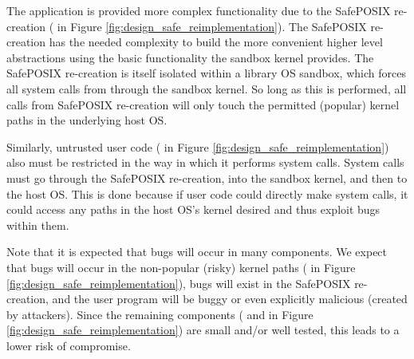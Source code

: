 The application is provided more complex functionality due to the SafePOSIX re-creation
( in Figure \ref{fig:design_safe_reimplementation}).
The SafePOSIX re-creation has the needed complexity to build the more convenient higher level
abstractions using the basic functionality the sandbox kernel provides.
The SafePOSIX re-creation is itself isolated within a library OS sandbox, which
forces all system calls from through the sandbox kernel.
So long as this is performed, all calls from SafePOSIX re-creation will only touch the permitted (popular) kernel paths in the underlying host OS.

Similarly, untrusted user code ( in Figure \ref{fig:design_safe_reimplementation}) also must be restricted in the way
in which it performs system calls.
System calls must go through the SafePOSIX re-creation, into the sandbox kernel, and then to the host OS.
This is done because if user code could directly make system calls, it could access any paths in the host OS's kernel desired
and thus exploit bugs within them.

Note that it is expected that bugs will occur in many components.
We expect that bugs will occur in the non-popular (risky) kernel paths ( in Figure \ref{fig:design_safe_reimplementation}),
bugs will exist in the SafePOSIX re-creation, and the user program will be buggy or even explicitly malicious (created by attackers).
Since the remaining components ( and  in Figure \ref{fig:design_safe_reimplementation})
are small and/or well tested, this leads to a lower risk of compromise.
